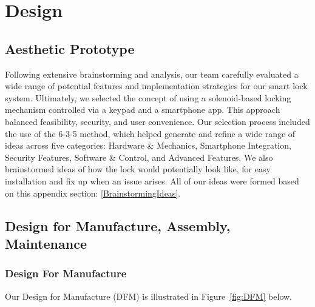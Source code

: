 \newpage

\section{Design}

\subsection{Aesthetic Prototype} %

Following extensive brainstorming and analysis, our team carefully evaluated a wide range of potential features and implementation strategies for our smart lock system. Ultimately, we selected the concept of using a solenoid-based locking mechanism controlled via a keypad and a smartphone app. This approach balanced feasibility, security, and user convenience. Our selection process included the use of the 6-3-5 method, which helped generate and refine a wide range of ideas across five categories: Hardware \& Mechanics, Smartphone Integration, Security Features, Software \& Control, and Advanced Features. We also brainstormed ideas of how the lock would potentially look like, for easy installation and fix up when an issue arises. All of our ideas were formed based on this appendix section: \ref{BrainstormingIdeas}.

\subsection{Design for Manufacture, Assembly, Maintenance} %
\subsubsection*{Design For Manufacture}
Our Design for Manufacture (DFM) is illustrated in Figure~\ref{fig:DFM} below.

